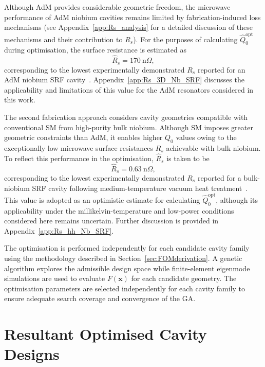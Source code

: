 \documentclass[
  aps,
  physrev,
  reprint,
  superscriptaddress,
  nofootinbib,
  amsmath,
  amssymb
]{revtex4-2}
\begin{document}
Although AdM provides considerable geometric freedom, the microwave performance of AdM niobium cavities remains limited by fabrication-induced loss mechanisms (see Appendix~\ref{app:Rs_analysis} for a detailed discussion of these mechanisms and their contribution to $R_s$). For the purposes of calculating $\hat Q_0^\mathrm{opt}$ during optimisation, the surface resistance is estimated as
\begin{equation}
    \hat{R}_s = 170~\mathrm{n}\Omega,
\end{equation}
corresponding to the lowest experimentally demonstrated $R_s$ reported for an AdM niobium SRF cavity~\cite{Frigola2015}. Appendix~\ref{app:Rs_3D_Nb_SRF} discusses the applicability and limitations of this value for the AdM resonators considered in this work.

The second fabrication approach considers cavity geometries compatible with conventional SM from high-purity bulk niobium. Although SM imposes greater geometric constraints than AdM, it enables higher $Q_0$ values owing to the exceptionally low microwave surface resistances $R_s$ achievable with bulk niobium. To reflect this performance in the optimisation, $\hat{R}_s$ is taken to be
\begin{equation}
    \hat{R}_s = 0.63~\mathrm{n}\Omega,
\end{equation}
corresponding to the lowest experimentally demonstrated $R_s$ reported for a bulk-niobium SRF cavity following medium-temperature vacuum heat treatment~\cite{Posen2020}. This value is adopted as an optimistic estimate for calculating $\hat Q_0^\mathrm{opt}$, although its applicability under the millikelvin-temperature and low-power conditions considered here remains uncertain. Further discussion is provided in Appendix~\ref{app:Rs_hh_Nb_SRF}.

The optimisation is performed independently for each candidate cavity family using the methodology described in Section~\ref{sec:FOMderivation}. A genetic algorithm explores the admissible design space while finite-element eigenmode simulations are used to evaluate $F(\mathbf{x})$ for each candidate geometry. The optimisation parameters are selected independently for each cavity family to ensure adequate search coverage and convergence of the GA.


\section{Resultant Optimised Cavity Designs}
\label{sec:results}
\end{document}
